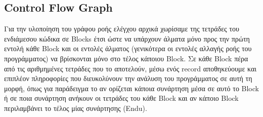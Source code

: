 \documentclass[12pt]{article}
\begin{document}
\subsection{Control Flow Graph}
Για την υλοποίηση του γράφου ροής ελέγχου αρχικά χωρίσαμε της τετράδες του ενδιάμεσου κώδικα σε Blocks έτσι ώστε να υπάρχουν άλματα μόνο προς την πρώτη εντολή κάθε Block και οι εντολές άλματος
(γενικότερα οι εντολές αλλαγής ροής του προγράμματος) να βρίσκονται μόνο στο τέλος κάποιου Block. Σε κάθε Block πέρα από τις αριθμημένες τετράδες που το αποτελούν, μέσω ενός record αποθηκεύουμε και επιπλέον πληροφορίες που διευκολύνουν την ανάλυση του προγράμματος σε αυτή τη μορφή, όπως για παράδειγμα το αν ορίζεται κάποια συνάρτηση μέσα σε αυτό το Block ή σε ποια συνάρτηση ανήκουν οι τετράδες του κάθε Block και αν κάποιο Block περιλαμβάνει το τέλος μίας συνάρτησης (Endu).
\end{document}
